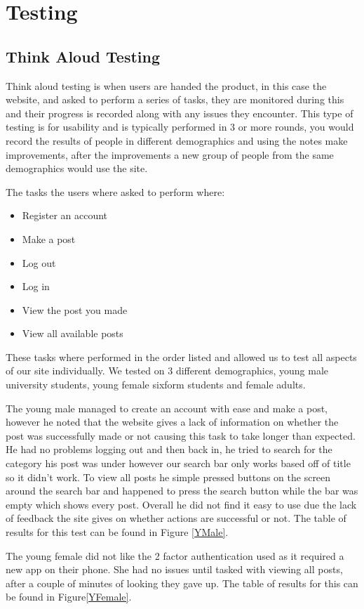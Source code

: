 \documentclass{cmpstyle}
\begin{document}
\section{Testing}
\subsection{Think Aloud Testing}
Think aloud testing is when users are handed the product, in this case the website, and asked to perform a series of tasks, they are monitored during this and their progress is recorded along with any issues they encounter. This type of testing is for usability and is typically performed in 3 or more rounds, you would record the results of people in different demographics and using the notes make improvements, after the improvements a new group of people from the same demographics would use the site.

The tasks the users where asked to perform where:
\begin{itemize}
	\item Register an account
	\item Make a post
	\item Log out
	\item Log in
	\item View the post you made
	\item View all available posts
\end{itemize}
These tasks where performed in the order listed and allowed us to test all aspects of our site individually. We tested on 3 different demographics, young male university students, young female sixform students and female adults. 

The young male managed to create an account with ease and make a post, however he noted that the website gives a lack of information on whether the post was successfully made or not causing this task to take longer than expected. He had no problems logging out and then back in, he tried to search for the category his post was under however our search bar only works based off of title so it didn't work. To view all posts he simple pressed buttons on the screen around the search bar and happened to press the search button while the bar was empty which shows every post. Overall he did not find it easy to use due the lack of feedback the site gives on whether actions are successful or not. The table of results for this test can be found in Figure \ref{YMale}.

The young female did not like the 2 factor authentication used as it required a new app on their phone. She had no issues until tasked with viewing all posts, after a couple of minutes of looking they gave up. The table of results for this can be found in Figure\ref{YFemale}.
\end{document}
